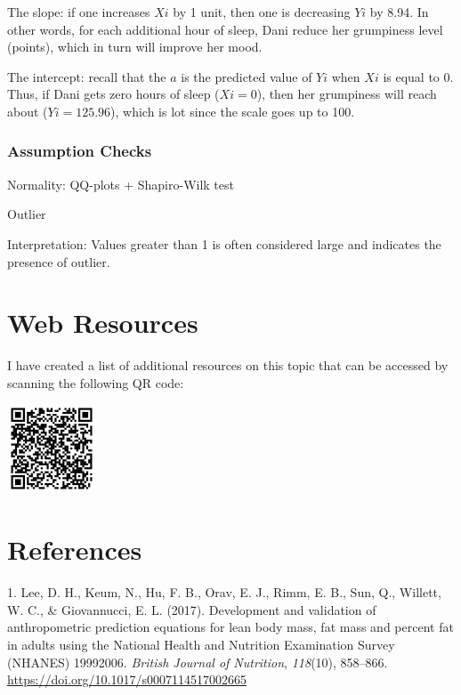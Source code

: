 \documentclass[
]{article}
\newlength{\cslhangindent}
\newlength{\cslentryspacingunit} %
\newenvironment{CSLReferences}[2] %
 {%
  \setlength{\parindent}{0pt}
  \ifodd #1
  \let\oldpar\par
  \def\par{\hangindent=\cslhangindent\oldpar}
  \fi
  \setlength{\parskip}{#2\cslentryspacingunit}
 }%
 {}
\begin{document}
The slope: if one increases \(Xi\) by 1 unit, then one is decreasing \(Yi\) by 8.94. In other words, for each additional hour of sleep, Dani reduce her grumpiness level (points), which in turn will improve her mood.

The intercept: recall that the \(a\) is the predicted value of \(Yi\) when \(Xi\) is equal to 0. Thus, if Dani gets zero hours of sleep (\(Xi = 0\)), then her grumpiness will reach about (\(Yi = 125.96\)), which is lot since the scale goes up to 100.

\hypertarget{assumption-checks}{%
\subsubsection{Assumption Checks}\label{assumption-checks}}

Normality: QQ-plots + Shapiro-Wilk test

Outlier

Interpretation: Values greater than 1 is often considered large and indicates the presence of outlier.

\hypertarget{web-resources}{%
\section{Web Resources}\label{web-resources}}

I have created a list of additional resources on this topic that can be accessed by scanning the following QR code:

\includegraphics[width=1.04167in,height=\textheight]{images/qr-m_regression.png}

\hypertarget{references}{%
\section*{References}\label{references}}

\hypertarget{refs}{}
\begin{CSLReferences}{1}{0}
\leavevmode{}%
1. Lee, D. H., Keum, N., Hu, F. B., Orav, E. J., Rimm, E. B., Sun, Q., Willett, W. C., \& Giovannucci, E. L. (2017). Development and validation of anthropometric prediction equations for lean body mass, fat mass and percent fat in adults using the National Health and Nutrition Examination Survey (NHANES) 1999{\textendash}2006. \emph{British Journal of Nutrition}, \emph{118}(10), 858--866. \url{https://doi.org/10.1017/s0007114517002665}

\end{CSLReferences}
\end{document}
